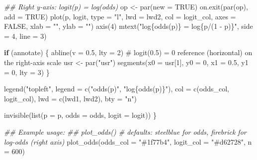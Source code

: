 \documentclass[
  letterpaper,
]{scrbook}
\newenvironment{Shaded}{\begin{snugshade}}{\end{snugshade}}
\newcommand{\AttributeTok}[1]{\textcolor[rgb]{0.40,0.45,0.13}{#1}}
\newcommand{\CommentTok}[1]{\textcolor[rgb]{0.37,0.37,0.37}{#1}}
\newcommand{\ConstantTok}[1]{\textcolor[rgb]{0.56,0.35,0.01}{#1}}
\newcommand{\ControlFlowTok}[1]{\textcolor[rgb]{0.00,0.23,0.31}{\textbf{#1}}}
\newcommand{\DecValTok}[1]{\textcolor[rgb]{0.68,0.00,0.00}{#1}}
\newcommand{\DocumentationTok}[1]{\textcolor[rgb]{0.37,0.37,0.37}{\textit{#1}}}
\newcommand{\FloatTok}[1]{\textcolor[rgb]{0.68,0.00,0.00}{#1}}
\newcommand{\FunctionTok}[1]{\textcolor[rgb]{0.28,0.35,0.67}{#1}}
\newcommand{\NormalTok}[1]{\textcolor[rgb]{0.00,0.23,0.31}{#1}}
\newcommand{\OtherTok}[1]{\textcolor[rgb]{0.00,0.23,0.31}{#1}}
\newcommand{\StringTok}[1]{\textcolor[rgb]{0.13,0.47,0.30}{#1}}
\begin{document}
\begin{Shaded}
\begin{Highlighting}[]
  \DocumentationTok{\#\# Right y{-}axis: logit(p) = log(odds)}
\NormalTok{  op }\OtherTok{\textless{}{-}} \FunctionTok{par}\NormalTok{(}\AttributeTok{new =} \ConstantTok{TRUE}\NormalTok{)}
  \FunctionTok{on.exit}\NormalTok{(}\FunctionTok{par}\NormalTok{(op), }\AttributeTok{add =} \ConstantTok{TRUE}\NormalTok{)}
  \FunctionTok{plot}\NormalTok{(p, logit, }\AttributeTok{type =} \StringTok{"l"}\NormalTok{, }\AttributeTok{lwd =}\NormalTok{ lwd2, }\AttributeTok{col =}\NormalTok{ logit\_col,}
       \AttributeTok{axes =} \ConstantTok{FALSE}\NormalTok{, }\AttributeTok{xlab =} \StringTok{""}\NormalTok{, }\AttributeTok{ylab =} \StringTok{""}\NormalTok{)}
  \FunctionTok{axis}\NormalTok{(}\DecValTok{4}\NormalTok{)}
  \FunctionTok{mtext}\NormalTok{(}\StringTok{"log\{odds(p)\} = log\{p/(1 {-} p)\}"}\NormalTok{, }\AttributeTok{side =} \DecValTok{4}\NormalTok{, }\AttributeTok{line =} \DecValTok{3}\NormalTok{)}

  \ControlFlowTok{if}\NormalTok{ (annotate) \{}
    \FunctionTok{abline}\NormalTok{(}\AttributeTok{v =} \FloatTok{0.5}\NormalTok{, }\AttributeTok{lty =} \DecValTok{2}\NormalTok{)}
    \CommentTok{\# logit(0.5) = 0 reference (horizontal) on the right{-}axis scale}
\NormalTok{    usr }\OtherTok{\textless{}{-}} \FunctionTok{par}\NormalTok{(}\StringTok{"usr"}\NormalTok{)}
    \FunctionTok{segments}\NormalTok{(}\AttributeTok{x0 =}\NormalTok{ usr[}\DecValTok{1}\NormalTok{], }\AttributeTok{y0 =} \DecValTok{0}\NormalTok{, }\AttributeTok{x1 =} \FloatTok{0.5}\NormalTok{, }\AttributeTok{y1 =} \DecValTok{0}\NormalTok{, }\AttributeTok{lty =} \DecValTok{3}\NormalTok{)}
\NormalTok{  \}}

  \FunctionTok{legend}\NormalTok{(}\StringTok{"topleft"}\NormalTok{,}
         \AttributeTok{legend =} \FunctionTok{c}\NormalTok{(}\StringTok{"odds(p)"}\NormalTok{, }\StringTok{"log\{odds(p)\}"}\NormalTok{),}
         \AttributeTok{col =} \FunctionTok{c}\NormalTok{(odds\_col, logit\_col),}
         \AttributeTok{lwd =} \FunctionTok{c}\NormalTok{(lwd1, lwd2), }\AttributeTok{bty =} \StringTok{"n"}\NormalTok{)}

  \FunctionTok{invisible}\NormalTok{(}\FunctionTok{list}\NormalTok{(}\AttributeTok{p =}\NormalTok{ p, }\AttributeTok{odds =}\NormalTok{ odds, }\AttributeTok{logit =}\NormalTok{ logit))}
\NormalTok{\}}

\DocumentationTok{\#\# Example usage:}
\DocumentationTok{\#\# plot\_odds()  \# defaults: steelblue for odds, firebrick for log{-}odds (right axis)}
\FunctionTok{plot\_odds}\NormalTok{(}\AttributeTok{odds\_col =} \StringTok{"\#1f77b4"}\NormalTok{, }\AttributeTok{logit\_col =} \StringTok{"\#d62728"}\NormalTok{, }\AttributeTok{n =} \DecValTok{600}\NormalTok{)}
\end{Highlighting}
\end{Shaded}
\end{document}
